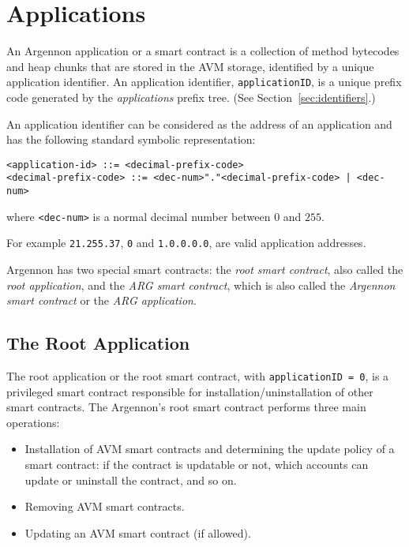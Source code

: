 
\section{Applications}\label{sec:applications}

An Argennon application or a smart contract is a collection of method bytecodes and heap chunks that are stored in
the AVM storage, identified by a unique application identifier. An application identifier, \texttt{applicationID}, is
a unique prefix code generated by the \emph{applications} prefix tree. (See Section~\ref{sec:identifiers}.)

An application identifier can
be considered as the address of an application and has the following standard symbolic representation:
\begin{verbatim}
<application-id> ::= <decimal-prefix-code>
<decimal-prefix-code> ::= <dec-num>"."<decimal-prefix-code> | <dec-num>
\end{verbatim}
where \texttt{<dec-num>} is a normal decimal number between $0$ and $255$.

For example \texttt{21.255.37}, \texttt{0} and \texttt{1.0.0.0.0}, are valid application addresses.

Argennon has two special smart contracts: the \emph{root smart contract}, also called the \emph{root application}, and
the \emph{ARG smart contract}, which is also called the \emph{Argennon smart contract} or the \emph{ARG application}.

\subsection{The Root Application}\label{subsec:the-root-app}

The root application or the root smart contract, with \texttt{applicationID = 0}, is a privileged smart contract
responsible for installation/uninstallation of other smart contracts. The Argennon's root smart contract
performs three main operations:

\begin{itemize}
    \item Installation of AVM smart contracts and determining the update policy of a smart
    contract: if the contract is updatable or not, which accounts can update or uninstall the contract, and so
    on.
    \item Removing AVM smart contracts.
    \item Updating an AVM smart contract (if allowed).
\end{itemize}

